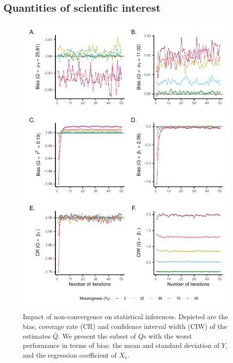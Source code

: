 \documentclass[Royal,times,sageh]{sagej}
\begin{document}
\hypertarget{quantities-of-scientific-interest}{%
\subsection{Quantities of scientific interest}\label{quantities-of-scientific-interest}}

\begin{figure}

{\centering \includegraphics{2.Manuscript_files/figure-latex/Qs-1} 

}

\caption{Impact of non-convergence on statistical inferences. Depicted are the bias, coverage rate (CR) and confidence interval width (CIW) of the estimates $\bar{Q}$. We present the subset of $Q$s with the worst performance in terms of bias: the mean and standard deviation of $Y$, and the regression coefficient of $X_1$.}\label{fig:Qs}
\end{figure}
\end{document}

